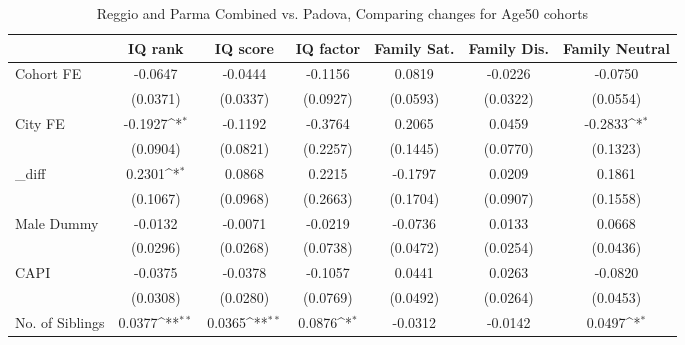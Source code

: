 \begin{table}[htbp]\centering
\def\sym#1{\ifmmode^{#1}\else\(^{#1}\)\fi}
\caption{Reggio and Parma Combined vs. Padova, Comparing changes for Age50 cohorts}
\begin{tabular}{l*{6}{c}}
\toprule
            &\multicolumn{1}{c}{IQ rank}&\multicolumn{1}{c}{IQ score}&\multicolumn{1}{c}{IQ factor}&\multicolumn{1}{c}{Family Sat.}&\multicolumn{1}{c}{Family Dis.}&\multicolumn{1}{c}{Family Neutral}\\
\midrule
Cohort FE   &     -0.0647         &     -0.0444         &     -0.1156         &      0.0819         &     -0.0226         &     -0.0750         \\
            &    (0.0371)         &    (0.0337)         &    (0.0927)         &    (0.0593)         &    (0.0322)         &    (0.0554)         \\
\addlinespace
City FE     &     -0.1927\sym{*}  &     -0.1192         &     -0.3764         &      0.2065         &      0.0459         &     -0.2833\sym{*}  \\
            &    (0.0904)         &    (0.0821)         &    (0.2257)         &    (0.1445)         &    (0.0770)         &    (0.1323)         \\
\addlinespace
\_diff       &      0.2301\sym{*}  &      0.0868         &      0.2215         &     -0.1797         &      0.0209         &      0.1861         \\
            &    (0.1067)         &    (0.0968)         &    (0.2663)         &    (0.1704)         &    (0.0907)         &    (0.1558)         \\
\addlinespace
Male Dummy  &     -0.0132         &     -0.0071         &     -0.0219         &     -0.0736         &      0.0133         &      0.0668         \\
            &    (0.0296)         &    (0.0268)         &    (0.0738)         &    (0.0472)         &    (0.0254)         &    (0.0436)         \\
\addlinespace
CAPI        &     -0.0375         &     -0.0378         &     -0.1057         &      0.0441         &      0.0263         &     -0.0820         \\
            &    (0.0308)         &    (0.0280)         &    (0.0769)         &    (0.0492)         &    (0.0264)         &    (0.0453)         \\
\addlinespace
No. of Siblings&      0.0377\sym{**} &      0.0365\sym{**} &      0.0876\sym{*}  &     -0.0312         &     -0.0142         &      0.0497\sym{*}  \\

\end{tabular}
\end{table}
